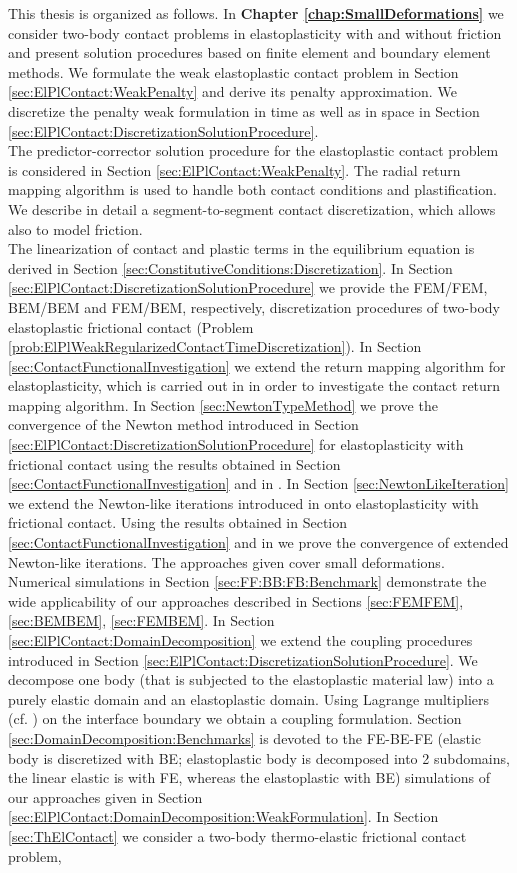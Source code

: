 This thesis is organized as follows. In \textbf{Chapter \ref{chap:SmallDeformations}} we consider two-body contact problems in elastoplasticity with and without friction and present solution procedures based on finite element and boundary element methods.  We formulate the weak elastoplastic contact problem in Section \ref{sec:ElPlContact:WeakPenalty} and derive its penalty approximation. We discretize  the penalty weak formulation in time as well as in space in Section \ref{sec:ElPlContact:DiscretizationSolutionProcedure}. \\ The predictor-corrector solution procedure for the elastoplastic contact problem is considered in Section \ref{sec:ElPlContact:WeakPenalty}.   The radial return mapping algorithm is used to handle both contact conditions and plastification. We describe in detail a segment-to-segment contact discretization, which allows also to model friction. \\ The linearization of contact and plastic terms in the equilibrium equation is derived in Section \ref{sec:ConstitutiveConditions:Discretization}. In Section  \ref{sec:ElPlContact:DiscretizationSolutionProcedure} we provide the FEM/FEM, BEM/BEM and FEM/BEM, respectively,  discretization procedures of two-body elastoplastic frictional contact (Problem \ref{prob:ElPlWeakRegularizedContactTimeDiscretization}). In Section \ref{sec:ContactFunctionalInvestigation} we extend the return mapping algorithm for elastoplasticity, which  is carried out in \cite{Bl97} in order to  investigate the contact return mapping algorithm.  In Section \ref{sec:NewtonTypeMethod} we prove the convergence of the Newton method introduced in Section \ref{sec:ElPlContact:DiscretizationSolutionProcedure} for elastoplasticity with frictional contact using the results obtained in Section \ref{sec:ContactFunctionalInvestigation} and in \cite{Bl97}. In Section \ref{sec:NewtonLikeIteration} we extend  the Newton-like iterations introduced in \cite{BlAx97}  onto elastoplasticity with frictional contact.  Using the results obtained in Section \ref{sec:ContactFunctionalInvestigation} and in \cite{BlAx97} we prove the convergence of extended Newton-like iterations.  The approaches given cover small deformations. Numerical simulations in Section \ref{sec:FF:BB:FB:Benchmark}  demonstrate the wide applicability of our approaches described in Sections \ref{sec:FEMFEM}, \ref{sec:BEMBEM}, \ref{sec:FEMBEM}. In Section \ref{sec:ElPlContact:DomainDecomposition} we extend the coupling procedures introduced in Section \ref{sec:ElPlContact:DiscretizationSolutionProcedure}. We decompose one body (that is subjected to the elastoplastic material law) into a  purely elastic domain and an elastoplastic domain. Using Lagrange multipliers (cf. \cite{W00}) on the interface boundary we obtain a coupling formulation. Section \ref{sec:DomainDecomposition:Benchmarks} is devoted to the FE-BE-FE (elastic body is discretized with BE; elastoplastic body is decomposed into 2 subdomains, the linear elastic is with  FE, whereas the elastoplastic with BE) simulations of our approaches given in Section \ref{sec:ElPlContact:DomainDecomposition:WeakFormulation}. In Section \ref{sec:ThElContact} we consider a two-body thermo-elastic frictional contact problem, 